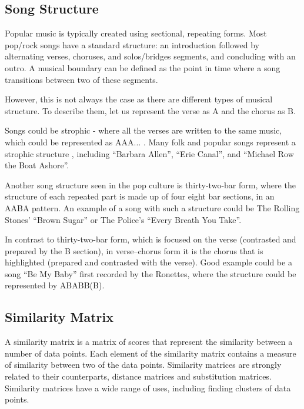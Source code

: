 \vspace{10pt}

\subsection{Song Structure}

Popular music is typically created using sectional, repeating forms. 
Most pop/rock songs have a standard structure: an introduction followed by alternating verses, choruses, and solos/bridges segments, and concluding with an outro. A musical boundary can be defined as the point in time where a song transitions between two of these segments.

However, this is not always the case as there are different types of musical structure. To describe them, let us represent the verse as A and the chorus as B. 

Songs could be strophic - where all the verses are written to the same music, which could be represented as AAA... . Many folk and popular songs represent a strophic structure \cite{strophic}, including ``Barbara Allen'', ``Erie Canal'', and ``Michael Row the Boat Ashore''.

Another song structure seen in the pop culture is thirty-two-bar form, where the structure of each repeated part is made up of four eight bar sections, in an AABA pattern. An example of a song with such a structure could be The Rolling Stones' ``Brown Sugar'' or The Police's ``Every Breath You Take''. 

In contrast to thirty-two-bar form, which is focused on the verse (contrasted and prepared by the B section), in verse–chorus form it is the chorus that is highlighted (prepared and contrasted with the verse). Good example could be a song ``Be My Baby'' first recorded by the Ronettes, where the structure could be represented by ABABB(B).

\vspace{10pt}

\subsection{Similarity Matrix}

A similarity matrix is a matrix of scores that represent the similarity between a number of data points. Each element of the similarity matrix contains a measure of similarity between two of the data points. Similarity matrices are strongly related to their counterparts, distance matrices and substitution matrices.
Similarity matrices have a wide range of uses, including finding clusters of data points.

